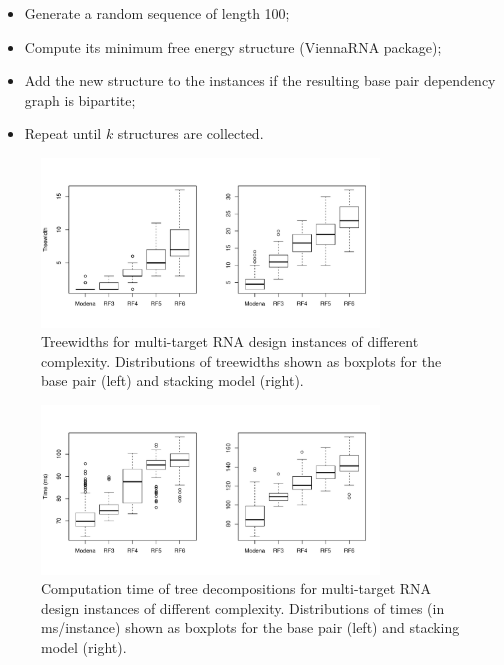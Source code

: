 \documentclass[10pt]{article}
\begin{document}
\begin{itemize}
\item Generate a random sequence of length 100;
\item Compute its minimum free energy structure (ViennaRNA package);
\item Add the new structure to the instances if the resulting base pair dependency graph is bipartite;
\item Repeat until $k$ structures are collected.
\end{itemize}

\begin{figure}[h!]
  \centering\includegraphics[width=0.8\textwidth]{Figs/td-widths}
  \caption{Treewidths for multi-target RNA design instances of
    different complexity. Distributions of treewidths shown as boxplots for the base pair (left) and stacking model (right).}
  \label{appfig:td-widths}
\end{figure}

\begin{figure}[h!]
  \centering
  \includegraphics[width=0.8\textwidth]{Figs/td-times}
  \caption{Computation time of tree decompositions for
    multi-target RNA design instances of different complexity.
    Distributions of times (in ms/instance) shown as boxplots for the base pair (left) and stacking model (right).}
  \label{appfig:td-times}
\end{figure}
\end{document}

